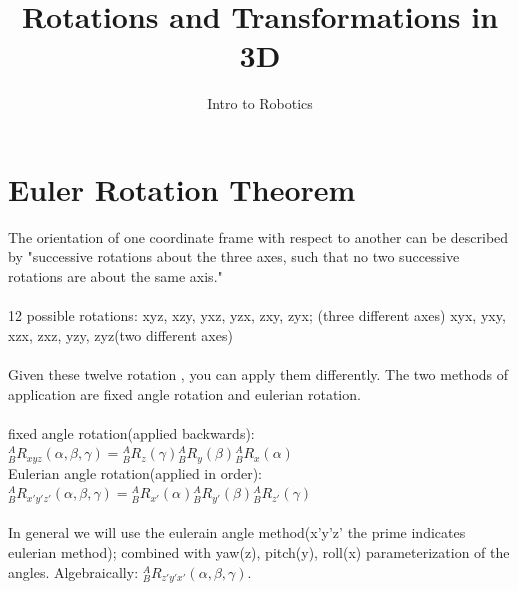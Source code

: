 \documentclass{article}
\title{Rotations and Transformations in 3D}
\author{Intro to Robotics}
\date{}
\begin{document}
\maketitle
\section{Euler Rotation Theorem}
The orientation of one coordinate frame with respect to another can be described by "successive  rotations about the three axes, such that no two successive rotations are about the same axis." \\\\
12 possible rotations: xyz, xzy, yxz, yzx, zxy, zyx; (three different axes) xyx, yxy, xzx, zxz, yzy, zyz(two different axes) \\\\
Given these twelve rotation , you can apply them differently. The two methods of application are fixed angle rotation and eulerian rotation.\\\\
fixed angle rotation(applied backwards):  ${}^{A}_{B}R_{xyz}(\alpha,\beta,\gamma)={}^{A}_{B}R_z(\gamma){}^{A}_{B}R_y(\beta){}^{A}_{B}R_x(\alpha)$\\
Eulerian angle rotation(applied in order): ${}^{A}_{B}R_{x'y'z'}(\alpha,\beta,\gamma)={}^{A}_{B}R_{x'}(\alpha){}^{A}_{B}R_{y'}(\beta){}^{A}_{B}R_{z'}(\gamma)$\\\\

In general we will use the eulerain angle method(x'y'z' the prime indicates eulerian method); combined with  yaw(z), pitch(y), roll(x) parameterization of the angles. Algebraically: ${}^{A}_{B}R_{z'y'x'}(\alpha,\beta,\gamma)$.\\\\
\newpage
\end{document}
